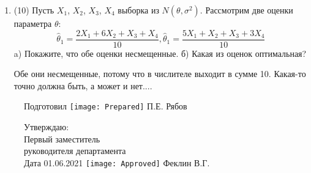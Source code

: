 \documentclass[a4paper,14pt]{article}
\begin{document}
\begin{enumerate}
\item


(10) Пусть $X _{1}$, $X _{2}$, $X _{3}$, $X _{4}$ выборка из $N(\theta, \sigma ^{2})$. Рассмотрим две оценки параметра $\theta$:
\[\hat \theta _{1} = \frac{2X _{1} + 6X _{2} + X _{3} + X _{4}}{10}, \hat \theta _{1} = \frac{5X _{1} + X _{2} + X _{3} + 3X _{4}}{10}\]
a) Покажите, что обе оценки несмещенные.
б) Какая из оценок оптимальная?




Обе они несмещенные, потому что в числителе выходит в сумме 10.
Какая-то точно должна быть, а может и нет....


\end{enumerate}

\begin{figure}[H]
	Подготовил
	\hfill
	\texttt{[image: Prepared]}
	П.Е. Рябов
\end{figure}


\begin{figure}[H]
	Утверждаю:\\
	Первый заместитель\\
	руководителя департамента\\
	Дата 01.06.2021
	\hfill
	\texttt{[image: Approved]}
	Феклин В.Г.
\end{figure}
\end{document}
